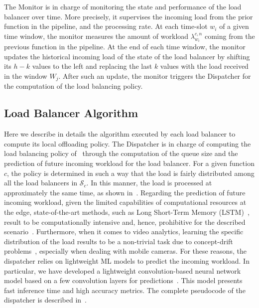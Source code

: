 The Monitor is in charge of monitoring the state and performance of the load balancer over time. More precisely, it supervises the incoming load from the prior function in the pipeline, and the processing rate. At each time-slot $w_i$ of a given time window, the monitor measures the amount of workload $\lambda^{c,n}_{w_i}$ coming from the previous function in the pipeline. At the end of each time window, the monitor updates the historical incoming load of the state of the load balancer by shifting its $h-k$ values to the left and replacing the last $k$ values with the load received in the window $W_{j}$. After such an update, the monitor triggers the Dispatcher for the computation of the load balancing policy.

\subsection{Load Balancer Algorithm}\label{subsec:dispatcher}
Here we describe in details the algorithm executed by each load balancer to compute its local offloading policy. The Dispatcher is in charge of computing the load balancing policy of~\videojam{} through the computation of the queue size and the prediction of future incoming workload for the load balancer. For a given function $c$, the policy is determined in such a way that the load is fairly distributed among all the load balancers in $\mathcal{S}_c$. In this manner, the load is processed at approximately the same time, as shown in~\cite{shah2007design}. Regarding the prediction of future incoming workload, given the limited capabilities of computational resources at the edge, state-of-the-art methods, such as Long Short-Term Memory (LSTM)~\cite{greff2016lstm}, result to be computationally intensive and, hence, prohibitive for the described scenario~\cite{lalapura2021recurrent}. Furthermore, when it comes to video analytics, learning the specific distribution of the load results to be a non-trivial task due to concept-drift problems~\cite{bhardwaj2022ekya},
especially when dealing with mobile cameras. For these reasons, the dispatcher relies on lightweight ML models to predict the incoming workload. In particular, we have developed a lightweight convolution-based neural network model based on a few convolution layers for predictions~\cite{KerasTCN}. This model presents fast inference time and high accuracy metrics. The complete pseudocode of the dispatcher is described in~.


